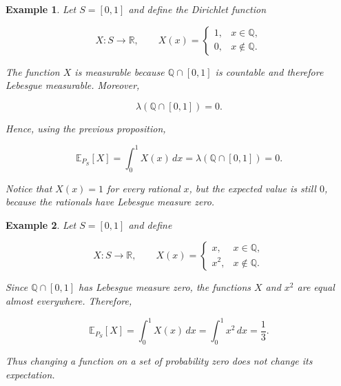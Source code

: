 \documentclass[10pt,a4paper]{book}
\newtheorem{example}{Example}[section]
\begin{document}
\begin{example}

    Let $S=[0,1]$ and define the Dirichlet function

    $$
        X:S\to\mathbb R,
        \qquad
        X(x)=
        \begin{cases}
            1, & x\in\mathbb Q,    \\
            0, & x\notin\mathbb Q.
        \end{cases}
    $$

    The function $X$ is measurable because $\mathbb Q\cap[0,1]$ is countable and therefore Lebesgue measurable. Moreover,

    $$
        \lambda(\mathbb Q\cap[0,1])=0.
    $$

    Hence, using the previous proposition,

    $$
        \mathbb E_{P_S}[X]
        =
        \int_0^1X(x)\,dx
        =
        \lambda(\mathbb Q\cap[0,1])
        =
        0.
    $$

    Notice that $X(x)=1$ for every rational $x$, but the expected value is still $0$, because the rationals have Lebesgue measure zero.

\end{example}

\begin{example}

    Let $S=[0,1]$ and define

    $$
        X:S\to\mathbb R,
        \qquad
        X(x)=
        \begin{cases}
            x,   & x\in\mathbb Q,    \\
            x^2, & x\notin\mathbb Q.
        \end{cases}
    $$

    Since $\mathbb Q\cap[0,1]$ has Lebesgue measure zero, the functions $X$ and $x^2$ are equal almost everywhere. Therefore,

    $$
        \mathbb E_{P_S}[X]
        =
        \int_0^1X(x)\,dx
        =
        \int_0^1x^2\,dx
        =
        \frac13.
    $$

    Thus changing a function on a set of probability zero does not change its expectation.

\end{example}
\end{document}
